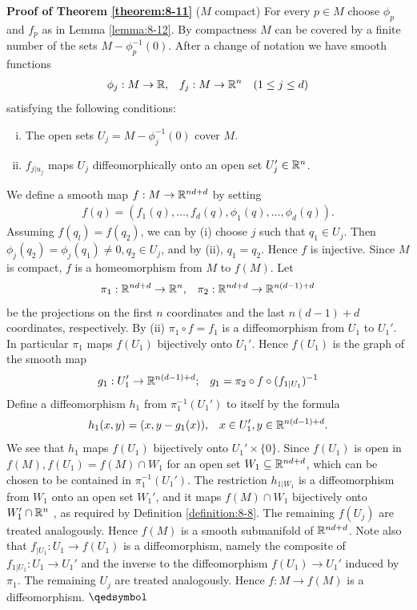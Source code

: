 \noindent\textbf{Proof of Theorem \ref{theorem:8-11}} ($M$ compact)%
For every $p\in M$ choose $\phi_p$ and $f_p$ as in
Lemma \ref{lemma:8-12}. By compactness $M$ can be covered by a finite number of the sets
$M - \phi_p^{-1}(0)$. After a change of notation we have smooth functions
\begin{align*}
  \phi_j: M\to{\ensuremath{\mathbb{R}}}, && f_j:M\to {\ensuremath{\mathbb{R}}}^n && (1\le j\le d)
\end{align*}
satisfying the following conditions:
\begin{enumerate}[(i)]
  \item The open sets $U_j = M - \phi_j^{-1}(0)$ cover $M$.
  \item $f_{j|u_j}$ maps $U_j$ diffeomorphically onto an open set $U_j'\in{\ensuremath{\mathbb{R}}}^n$.
\end{enumerate}
We define a smooth map $f:M\to {\ensuremath{\mathbb{R}}}^{nd+d}$ by setting 
\begin{align*}
  f(q) = (f_1(q), \ldots, f_d(q), \phi_1(q), \ldots, \phi_d(q) ).
\end{align*}
Assuming $f(q_l) = f(q_2)$, we can by (i) choose $j$ such that $q_1\in U_j$. Then
$\phi_j(q_2)=\phi_j(q_1)\neq 0, q_2\in U_j$, and by (ii), $q_1=q_2$. Hence $f$ is injective. 
Since $M$ is compact, $f$ is a homeomorphism from $M$ to $f(M).$ Let
\begin{align*}
  \pi_1:{\mathbb{R}}^{nd+d}\to{\ensuremath{\mathbb{R}}}^n, && \pi_2:{\mathbb{R}}^{nd+d}\to{\ensuremath{\mathbb{R}}}^{n(d-1) + d}
\end{align*}
be the projections on the first $n$ coordinates and the last $n(d - 1) + d$ coordinates,
respectively. By (ii) $\pi_1\circ f = f_1$ is a diffeomorphism from $U_1$ to $U_1'$. In particular
$\pi_1$ maps $f(U_1)$ bijectively onto $U_1'$. Hence $f(U_1)$ is the graph of the smooth map
\begin{align*}
  g_1:U_1'\to{\ensuremath{\mathbb{R}}}^{n(d-1)+d}; && 
  g_1 = \pi_2\circ f\circ (f_{1|U_1})^{-1}
\end{align*}
Define a diffeomorphism $h_1$ from $\pi_1^{-1}(U_1')$ to itself by the formula 
\begin{align*}
  h_1(x, y) = (x, y-g_1(x)), && x\in U_1', y\in {\ensuremath{\mathbb{R}}}^{n(d-1)+d}.
\end{align*}
We see that $h_1$ maps $f(U_1)$ bijectively onto $U_1'\times\{0\}$. Since $f(U_1)$ is open in
$f(M), f(U_1) = f(M)\cap W_1$ for an open set $W_1\subseteq {\ensuremath{\mathbb{R}}}^{nd+d}$, which can be chosen
to be contained in $\pi_1^{-1}(U_1')$. The restriction $h_{1|W_1}$ is a diffeomorphism from $W_1$
onto an open set $W_1'$, and it maps $f(M)\cap W_1$ bijectively onto $W_1'\cap {\ensuremath{\mathbb{R}}}^n$ , as
required by Definition \ref{definition:8-8}. The remaining $f(U_j)$ are treated analogously. Hence
$f(M)$ is a smooth submanifold of ${\mathbb{R}}^{nd+d}$. Note also that $f_{|U_1}:U_1\to f(U_1)$ is
a diffeomorphism, namely the composite of $f_{1|U_1}:U_1\to U_1'$ and the inverse to
the diffeomorphism $f(U_1)\to U_1'$ induced by $\pi_1$. The remaining $U_j$ are treated
analogously. Hence $f: M\to f(M)$ is a diffeomorphism. \hfill\(\qedsymbol\)

